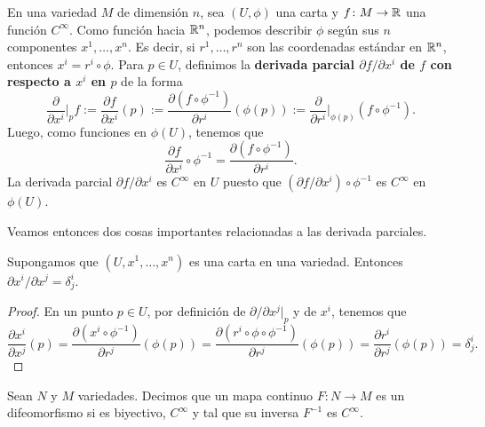\begin{example}
	En una variedad $M$ de dimensión $n$, sea $(U,\phi)$ una carta y $f \colon M \to \mathbb{R}$ una función $C^{\infty}$. Como función hacia $\mathbb{R}^{n}$, podemos describir $\phi$ según sus $n$ componentes $x^{1},\dots,x^{n}$. Es decir, si $r^{1},\dots,r^{n}$ son las coordenadas estándar en $\mathbb{R}^{n}$, entonces $x^{i} = r^{i} \circ \phi$. Para $p \in U$, definimos la \textbf{derivada parcial $\partial f \slash \partial x^{i}$ de $f$ con respecto a $x^{i}$ en $p$} de la forma
	\[ \frac{\partial}{\partial x^{i}} \bigg|_{p} f := \frac{\partial f}{\partial x^{i}}(p) := \frac{\partial (f \circ \phi^{-1})}{\partial r^{i}} (\phi(p)) := \frac{\partial}{\partial r^{i}} \bigg|_{\phi(p)} (f \circ \phi^{-1}). \]
	Luego, como funciones en $\phi(U)$, tenemos que
	\[ \frac{\partial f}{\partial x^{i}} \circ \phi^{-1} = \frac{\partial (f \circ \phi^{-1})}{\partial r^{i}}. \]
	La derivada parcial $\partial f \slash \partial x^{i}$ es $C^{\infty}$ en $U$ puesto que $(\partial f \slash \partial x^{i}) \circ \phi^{-1}$ es $C^{\infty}$ en $\phi(U)$.
\end{example}

Veamos entonces dos cosas importantes relacionadas a las derivada parciales.

\begin{proposition}
	Supongamos que $(U,x^{1},\dots,x^{n})$ es una carta en una variedad. Entonces $\partial x^{i} \slash \partial x^{j} = \delta_{j}^{i}$.
\end{proposition}
\begin{proof}
	En un punto $p \in U$, por definición de $\partial \slash \partial x^{j} \big|_{p}$ y de $x^{i}$, tenemos que
	\[ \frac{\partial x^{i}}{\partial x^{j}} (p) = \frac{\partial (x^{i} \circ \phi^{-1})}{\partial r^{j}} (\phi(p)) = \frac{\partial (r^{i} \circ \phi \circ \phi^{-1})}{\partial r^{j}}(\phi(p)) = \frac{\partial r^{i}}{\partial r^{j}} (\phi(p)) = \delta_{j}^{i}. \]
\end{proof}

\begin{definition}
	Sean $N$ y $M$ variedades. Decimos que un mapa continuo $F \colon N \to M$ es un difeomorfismo si es biyectivo, $C^{\infty}$ y tal que su inversa $F^{-1}$ es $C^{\infty}$.
\end{definition}

